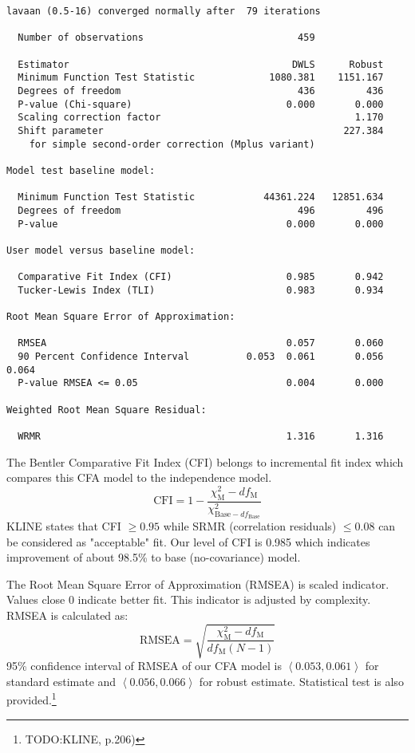 \documentclass[10pt,a4paper]{article}
\begin{document}
\begin{verbatim}
lavaan (0.5-16) converged normally after  79 iterations

  Number of observations                           459

  Estimator                                       DWLS      Robust
  Minimum Function Test Statistic             1080.381    1151.167
  Degrees of freedom                               436         436
  P-value (Chi-square)                           0.000       0.000
  Scaling correction factor                                  1.170
  Shift parameter                                          227.384
    for simple second-order correction (Mplus variant)

Model test baseline model:

  Minimum Function Test Statistic            44361.224   12851.634
  Degrees of freedom                               496         496
  P-value                                        0.000       0.000

User model versus baseline model:

  Comparative Fit Index (CFI)                    0.985       0.942
  Tucker-Lewis Index (TLI)                       0.983       0.934

Root Mean Square Error of Approximation:

  RMSEA                                          0.057       0.060
  90 Percent Confidence Interval          0.053  0.061       0.056  0.064
  P-value RMSEA <= 0.05                          0.004       0.000

Weighted Root Mean Square Residual:

  WRMR                                           1.316       1.316
\end{verbatim}
The Bentler Comparative Fit Index (CFI) belongs to incremental fit index which compares this CFA model to the independence model. 
\begin{equation}
\text{CFI} = 1 - \frac{\chi^2_{\text{M}} - df_{\text{M}}}{\chi^2_{\text{Base}- df_{\text{Base}}}}
\end{equation}
KLINE states that CFI $\geq 0.95$ while SRMR (correlation residuals) $\leq 0.08$ can be considered as "acceptable" fit. Our level of CFI is 0.985 which indicates improvement of about 98.5\% to base (no-covariance) model. \smallskip

The Root Mean Square Error of Approximation (RMSEA) is scaled indicator. Values close 0 indicate better fit. This indicator is adjusted by complexity. RMSEA is calculated as:
\begin{equation}
\text{RMSEA}=\sqrt{\frac{\chi^2_{\text{M}} - df_{\text{M}}}{df_{\text{M}}\left(N-1\right)}}
\end{equation}
95\% confidence interval of RMSEA of our CFA model is $\left\langle 0.053, 0.061 \right\rangle$ for standard estimate and  $\left\langle 0.056, 0.066 \right\rangle$ for robust estimate. Statistical test is also provided.\footnote{TODO:KLINE, p.206)}
\end{document}
